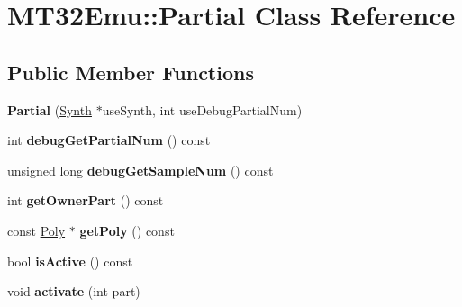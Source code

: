 \hypertarget{classMT32Emu_1_1Partial}{\section{M\-T32\-Emu\-:\-:Partial Class Reference}
\label{classMT32Emu_1_1Partial}
}
\subsection*{Public Member Functions}
\begin{DoxyCompactItemize}
\item 
\hypertarget{classMT32Emu_1_1Partial_a59ea8f71def382202fd53c7a920788ac}{{\bfseries Partial} (\hyperlink{classMT32Emu_1_1Synth}{Synth} $\ast$use\-Synth, int use\-Debug\-Partial\-Num)}\label{classMT32Emu_1_1Partial_a59ea8f71def382202fd53c7a920788ac}

\item 
\hypertarget{classMT32Emu_1_1Partial_a7410808cbcf8c65a1268703189640460}{int {\bfseries debug\-Get\-Partial\-Num} () const }\label{classMT32Emu_1_1Partial_a7410808cbcf8c65a1268703189640460}

\item 
\hypertarget{classMT32Emu_1_1Partial_a2a454c4d62e1979be362162ae53a4da3}{unsigned long {\bfseries debug\-Get\-Sample\-Num} () const }\label{classMT32Emu_1_1Partial_a2a454c4d62e1979be362162ae53a4da3}

\item 
\hypertarget{classMT32Emu_1_1Partial_a28ce4e6644a1f7640ff7ffc24af067c3}{int {\bfseries get\-Owner\-Part} () const }\label{classMT32Emu_1_1Partial_a28ce4e6644a1f7640ff7ffc24af067c3}

\item 
\hypertarget{classMT32Emu_1_1Partial_a4294bd6009907d251e7a6ef09f4b8058}{const \hyperlink{classMT32Emu_1_1Poly}{Poly} $\ast$ {\bfseries get\-Poly} () const }\label{classMT32Emu_1_1Partial_a4294bd6009907d251e7a6ef09f4b8058}

\item 
\hypertarget{classMT32Emu_1_1Partial_ac82540b14ea21f893c6d7ea3756aa0e1}{bool {\bfseries is\-Active} () const }\label{classMT32Emu_1_1Partial_ac82540b14ea21f893c6d7ea3756aa0e1}

\item 
\hypertarget{classMT32Emu_1_1Partial_a23ec51bcd762a298592dc81976fe7d6c}{void {\bfseries activate} (int part)}\label{classMT32Emu_1_1Partial_a23ec51bcd762a298592dc81976fe7d6c}


\end{DoxyCompactItemize}
